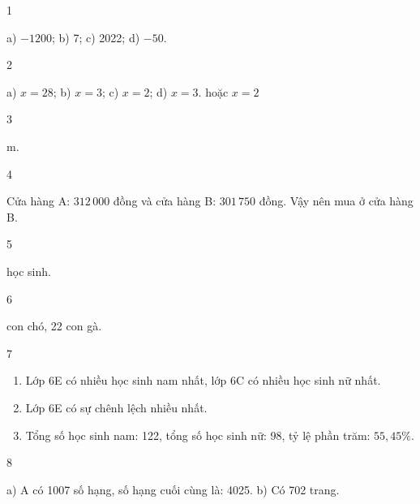 \begin{Solbook}{1}
 \par \noindent a) $-1200$; \hspace {2cm} b) 7; \hspace {2cm} c) 2022; \hspace {2cm} d) $-50$.  \hfill \qedEX 
\end{Solbook}
\begin{Solbook}{2}
 \par \noindent a) $x=28$; \hspace {1.5cm} b) $x=3$; \hspace {1.5cm} c) $x=2$; \hspace {1.5cm} d) $x=3$. hoặc $x=2$  \hfill \qedEX 
\end{Solbook}
\begin{Solbook}{3}
 \par {} m. \hfill \qedEX 
\end{Solbook}
\begin{Solbook}{4}
 \par \noindent Cửa hàng A: $312\,000$ đồng và cửa hàng B: $301\,750$ đồng. Vậy nên mua ở cửa hàng B. \hfill \qedEX 
\end{Solbook}
\begin{Solbook}{5}
 \par {} học sinh. \hfill \qedEX 
\end{Solbook}
\begin{Solbook}{6}
 \par {} con chó, 22 con gà. \hfill \qedEX 
\end{Solbook}
\begin{Solbook}{7}
 \par \noindent  \begin {enumerate} \item Lớp 6E có nhiều học sinh nam nhất, lớp 6C có nhiều học sinh nữ nhất. \item Lớp 6E có sự chênh lệch nhiều nhất. \item Tổng số học sinh nam: 122, tổng số học sinh nữ: 98, tỷ lệ phần trăm: $55,45\%$. \end {enumerate}  \hfill \qedEX 
\end{Solbook}
\begin{Solbook}{8}
 \par \noindent a) A có 1007 số hạng, số hạng cuối cùng là: 4025. \qquad b) Có 702 trang. \hfill \qedEX 
\end{Solbook}
